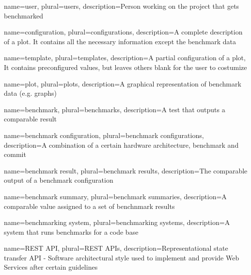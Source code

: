 \makenoidxglossaries

{
	name=user,
	plural=users,
	description={Person working on the project that gets benchmarked}
}

{
	name=configuration,
	plural=configurations,
	description={A complete description of a \gls{plot}. It contains all the necessary information except the benchmark data}
}

{
	name=template,
	plural=templates,
	description={A partial configuration of a \gls{plot}, It contains preconfigured values, but leaves others blank for the user to costumize}
}

{
	name=plot,
	plural=plots,
	description={A graphical representation of benchmark data (e.g. graphs)}
}

{
	name=benchmark,
	plural=benchmarks,
	description={A test that outputs a comparable result}
}

{
	name=benchmark configuration,
	plural=benchmark configurations,
	description={A combination of a certain hardware architecture, \gls{benchmark} and commit}
}

{
	name=benchmark result,
	plural=benchmark results,
	description={The comparable output of a \gls{benchmark configuration}}
}

{
	name=benchmark summary,
	plural=benchmark summaries,
	description={A comparable value assigned to a set of benchnmark results}
}

{
	name=benchmarking system,
	plural=benchmarking systems,
	description={A system that runs benchmarks for a code base}
}

{
	name=REST API,
	plural=REST APIs,
	description={Representational state transfer API - Software architectural style used to implement and provide Web Services after certain guidelines}
}


